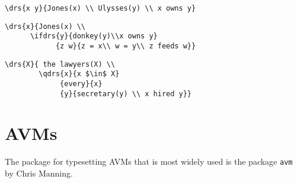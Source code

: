 \begin{verbatim}
\drs{x y}{Jones(x) \\ Ulysses(y) \\ x owns y}
\end{verbatim}



\begin{verbatim}
\drs{x}{Jones(x) \\
      \ifdrs{y}{donkey(y)\\x owns y}
            {z w}{z = x\\ w = y\\ z feeds w}}
\end{verbatim}


\begin{verbatim}
\drs{X}{ the lawyers(X) \\
        \qdrs{x}{x $\in$ X}
             {every}{x}
             {y}{secretary(y) \\ x hired y}}
\end{verbatim}


\section{AVMs}

The package for typesetting AVMs that is most widely used is the package \texttt{avm}
by Chris Manning. 



